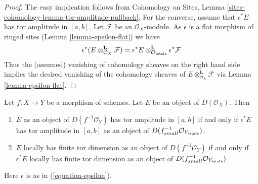 \begin{proof}
The easy implication follows from
Cohomology on Sites, Lemma \ref{sites-cohomology-lemma-tor-amplitude-pullback}.
For the converse, assume that $\epsilon^*E$ has tor amplitude in $[a, b]$.
Let $\mathcal{F}$ be an $\mathcal{O}_X$-module. As $\epsilon$ is a flat
morphism of ringed sites (Lemma \ref{lemma-epsilon-flat})
we have
$$
\epsilon^*(E \otimes^\mathbf{L}_{\mathcal{O}_X} \mathcal{F})
=
\epsilon^*E
\otimes^\mathbf{L}_{\mathcal{O}_\etale}
\epsilon^*\mathcal{F}
$$
Thus the (assumed) vanishing of cohomology sheaves on the right hand side
implies the desired vanishing of the cohomology sheaves of
$E \otimes^\mathbf{L}_{\mathcal{O}_X} \mathcal{F}$ via
Lemma \ref{lemma-epsilon-flat}.
\end{proof}

\begin{lemma}
\label{lemma-tor-dimension-rel}
Let $f : X \to Y$ be a morphism of schemes. Let $E$ be an object
of $D(\mathcal{O}_X)$. Then
\begin{enumerate}
\item $E$ as an object of $D(f^{-1}\mathcal{O}_Y)$ has tor amplitude in
$[a, b]$ if and only if $\epsilon^*E$ has tor amplitude in $[a, b]$
as an object of $D(f_{small}^{-1}\mathcal{O}_{Y_\etale})$.
\item $E$ locally has finite tor dimension as an object of
$D(f^{-1}\mathcal{O}_Y)$ if and only if $\epsilon^*E$
locally has finite tor dimension as an object of
$D(f_{small}^{-1}\mathcal{O}_{Y_\etale})$.
\end{enumerate}
Here $\epsilon$ is as in (\ref{equation-epsilon}).
\end{lemma}

